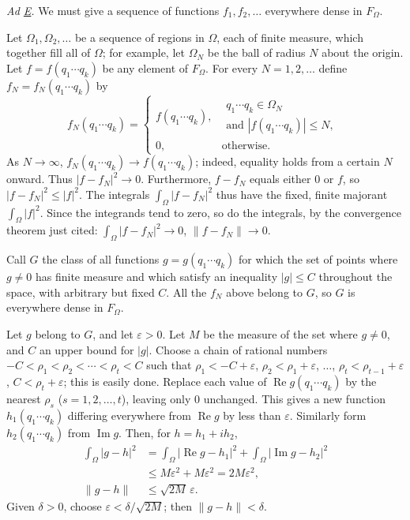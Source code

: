 \documentclass[fontsize=13pt,twoside,openany,headings=normal,parskip=false,bookmarkpackage=false,DIV=calc]{scrbook}
\begin{document}
\emph{Ad \hyperref[ax:II.E]{E}.} We must give a sequence of functions $f_1,f_2,\ldots$ everywhere dense in $F_\Omega$.

Let $\Omega_1,\Omega_2,\ldots$ be a sequence of regions in $\Omega$, each of finite measure, which together fill all of $\Omega$; for example, let $\Omega_N$ be the ball of radius $N$ about the origin. Let $f=f(q_1\cdots q_k)$ be any element of $F_\Omega$. For every $N=1,2,\ldots$ define $f_N=f_N(q_1\cdots q_k)$ by
\[
f_N(q_1\cdots q_k)=
\begin{cases}
f(q_1\cdots q_k),&\begin{gathered}q_1\cdots q_k\in\Omega_N\\\text{and }|f(q_1\cdots q_k)|\leq N,\end{gathered}\\
0,&\text{otherwise}.
\end{cases}
\]
As $N\to\infty$, $f_N(q_1\cdots q_k)\to f(q_1\cdots q_k)$; indeed, equality holds from a certain $N$ onward. Thus $|f-f_N|^2\to0$. Furthermore, $f-f_N$ equals either $0$ or $f$, so $|f-f_N|^2\leq|f|^2$. The integrals $\int_\Omega|f-f_N|^2$ thus have the fixed, finite majorant $\int_\Omega|f|^2$. Since the integrands tend to zero, so do the integrals, by the convergence theorem just cited: $\int_\Omega|f-f_N|^2\to0$, $\|f-f_N\|\to0$.

Call $G$ the class of all functions $g=g(q_1\cdots q_k)$ for which the set of points where $g\ne0$ has finite measure and which satisfy an inequality $|g|\leq C$ throughout the space, with arbitrary but fixed $C$. All the $f_N$ above belong to $G$, so $G$ is everywhere dense in $F_\Omega$.

Let $g$ belong to $G$, and let $\varepsilon>0$. Let $M$ be the measure of the set where $g\ne0$, and $C$ an upper bound for $|g|$. Choose a chain of rational numbers $-C<\rho_1<\rho_2<\cdots<\rho_t<C$ such that $\rho_1<-C+\varepsilon$, $\rho_2<\rho_1+\varepsilon$, $\ldots$, $\rho_t<\rho_{t-1}+\varepsilon$, $C<\rho_t+\varepsilon$; this is easily done. Replace each value of $\operatorname{Re}g(q_1\cdots q_k)$ by the nearest $\rho_s$ ($s=1,2,\ldots,t$), leaving only $0$ unchanged. This gives a new function $h_1(q_1\cdots q_k)$ differing everywhere from $\operatorname{Re}g$ by less than $\varepsilon$. Similarly form $h_2(q_1\cdots q_k)$ from $\operatorname{Im}g$. Then, for $h=h_1+ih_2$,
\begin{align*}
\int_\Omega|g-h|^2
&=\int_\Omega|\operatorname{Re}g-h_1|^2+\int_\Omega|\operatorname{Im}g-h_2|^2\\
&\leq M\varepsilon^2+M\varepsilon^2=2M\varepsilon^2,\\
\|g-h\|&\leq\sqrt{2M}\,\varepsilon.
\end{align*}
Given $\delta>0$, choose $\varepsilon<\delta/\sqrt{2M}$; then $\|g-h\|<\delta$.
\end{document}
